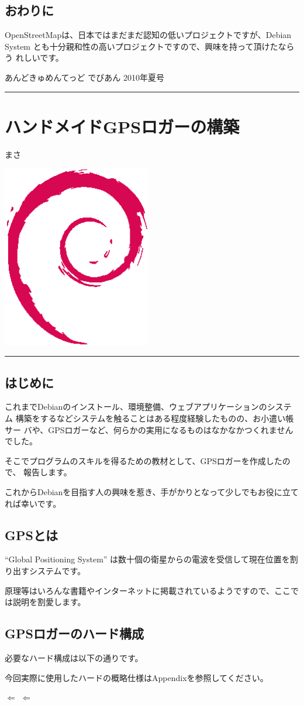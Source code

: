 \documentclass[mingoth,a4paper]{jsarticle}
\renewcommand{\dancersection}[2]{%
\newpage
あんどきゅめんてっど でびあん 2010年夏号
%
\vspace{0.1mm}\\
{\color{dancerlightblue}\rule{\hsize}{2mm}}

%
%
\begin{minipage}[t]{0.6\hsize}
\color{dancerdarkblue}
\vspace{1cm}
\section{#1}
\hfill{}#2\\
\end{minipage}
\begin{minipage}[t]{0.4\hsize}
\vspace{-2cm}
\hfill{}\includegraphics[height=8cm]{image200502/openlogo-nd.eps}\\
\vspace{-5cm}
\end{minipage}
%
%
{\color{dancerdarkblue}\rule{0.74\hsize}{2mm}}
%
\vspace{2cm}
}
\begin{document}
\subsection{おわりに}
OpenStreetMapは、日本ではまだまだ認知の低いプロジェクトですが、Debian
System とも十分親和性の高いプロジェクトですので、興味を持って頂けたならう
れしいです。

\dancersection{ハンドメイドGPSロガーの構築}{まさ}

\subsection{はじめに}

これまでDebianのインストール、環境整備、ウェブアプリケーションのシステム
構築をするなどシステムを触ることはある程度経験したものの、お小遣い帳サー
バや、GPSロガーなど、何らかの実用になるものはなかなかつくれませんでした。

そこでプログラムのスキルを得るための教材として、GPSロガーを作成したので、
報告します。

これからDebianを目指す人の興味を惹き、手がかりとなって少しでもお役に立て
れば幸いです。

\subsection{GPSとは}
``Global Positioning System'' は数十個の衛星からの電波を受信して現在位置を割り出すシステムです。

原理等はいろんな書籍やインターネットに掲載されているようですので、ここでは説明を割愛します。

\subsection{GPSロガーのハード構成}
必要なハード構成は以下の通りです。

今回実際に使用したハードの概略仕様はAppendixを参照してください。
\begin{center}
        \hspace{1em}$\Longleftarrow$\hspace{1em}
        \hspace{1em}$\Longleftarrow$\hspace{1em}
\end{center}
\end{document}
